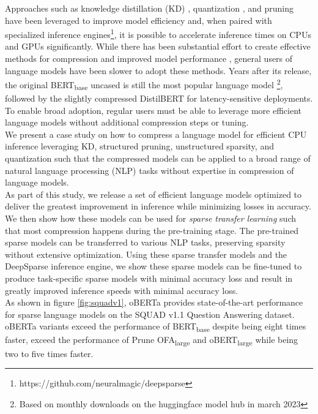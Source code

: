 \documentclass[11pt]{article}
\begin{document}
Approaches such as knowledge distillation (KD) \cite{Hinton2015DistillingTK}, quantization \cite{Zafrir2019Q8BERTQ8}, and pruning \cite{Kurtic2022TheOB} have been leveraged to improve model efficiency and, when paired with specialized inference engines\footnote{https://github.com/neuralmagic/deepsparse}, it is possible to accelerate inference times on CPUs and GPUs significantly. While there has been substantial effort to create effective methods for compression \cite{Jiao2020TinyBERTDB, Sun2020MobileBERTAC} and improved model performance \cite{Liu2019RoBERTaAR}, general users of language models have been slower to adopt these methods. Years after its release, the original  BERT\textsubscript{base} uncased \cite{Devlin2019BERTPO} is still the most popular language model \footnote{Based on monthly downloads on the huggingface model hub in march 2023}, followed by the slightly compressed DistilBERT \cite{Sanh2019DistilBERTAD} for latency-sensitive deployments.
To enable broad adoption, regular users must be able to leverage more efficient language models without additional compression steps or tuning.\\
We present a case study on how to compress a language model for efficient CPU inference leveraging KD, structured pruning, unstructured sparsity, and quantization such that the compressed models can be applied to a broad range of natural language processing (NLP) tasks without expertise in compression of language models. \\
As part of this study, we release a set of efficient language models optimized to deliver the greatest improvement in inference while minimizing losses in accuracy. We then show how these models can be used for \textit{sparse transfer learning} \cite{Iofinova2021HowWD, Zafrir2021PruneOF} such that most compression happens during the pre-training stage. The pre-trained sparse models can be transferred to various NLP tasks, preserving sparsity without extensive optimization. Using these sparse transfer models and the DeepSparse inference engine, we show these sparse models can be fine-tuned to produce task-specific sparse models with minimal accuracy loss and result in greatly improved inference speeds with minimal accuracy loss.\\
As shown in figure \ref{fig:squadv1}, oBERTa provides state-of-the-art performance for sparse language models on the SQUAD v1.1 Question Answering dataset. oBERTa variants exceed the performance of BERT\textsubscript{base} despite being eight times faster, exceed the performance of Prune OFA\textsubscript{large} and oBERT\textsubscript{large} while being two to five times faster.
\end{document}
